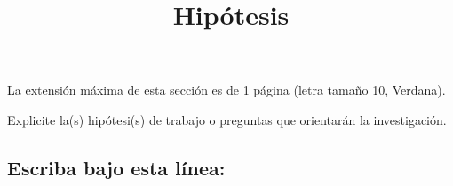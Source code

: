 \documentclass[10pt,prl]{revtex4}
\begin{document}
\title{Hip\'otesis}
\maketitle

La extensi\'on m\'axima de esta secci\'on es de 1 p\'agina (letra tama\~no 10, Verdana).

Explicite la(s) hip\'otesi(s) de trabajo o preguntas que orientar\'an la investigaci\'on.

\maketitle
\subsection{Escriba bajo esta l\'inea:}
\end{document}

